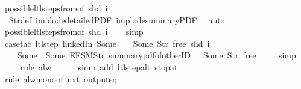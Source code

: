 \begin{isabellebody}
\ possible{\isacharunderscore}ltl{\isacharunderscore}steps{\isacharunderscore}from{\isacharunderscore}{}{\isacharbrackleft}of\ {\isachardoublequoteopen}shd\ i{\isachardoublequoteclose}{\isacharbrackright}\isanewline
\ \ Str{\isacharunderscore}def\ implode{\isacharunderscore}detailedPDF\ implode{\isacharunderscore}summaryPDF\ \isamarkupfalse%
\ auto{\isacharbrackleft}{}{\isacharbrackright}\isanewline
\ \ \isamarkupfalse%
\ possible{\isacharunderscore}ltl{\isacharunderscore}steps{\isacharunderscore}from{\isacharunderscore}{}{\isacharbrackleft}of\ {\isachardoublequoteopen}shd\ i{\isachardoublequoteclose}{\isacharbrackright}\isanewline
\ \ \isamarkupfalse%
\ simp\isanewline
\ \ \isamarkupfalse%
\ {\isacharparenleft}case{\isacharunderscore}tac\ {\isachardoublequoteopen}ltl{\isacharunderscore}step\ linkedIn\ {\isacharparenleft}Some\ {}{\isacharparenright}\ {\isacharparenleft}{\isacharless}{\isachargreater}{\isacharparenleft}{}\ {\isachardollar}{\isacharcolon}{\isacharequal}\ Some\ {\isacharparenleft}Str\ {\isacharprime}{\isacharprime}free{\isacharprime}{\isacharprime}{\isacharparenright}{\isacharparenright}{\isacharparenright}\ {\isacharparenleft}shd\ i{\isacharparenright}\ {\isacharequal}\isanewline
\ \ \ \ {\isacharparenleft}Some\ {}{\isacharcomma}\ {\isacharbrackleft}Some\ {\isacharparenleft}EFSM{\isachardot}Str\ {\isacharprime}{\isacharprime}summary{\isacharunderscore}pdf{\isacharunderscore}of{\isacharunderscore}otherID{\isacharprime}{\isacharprime}{\isacharparenright}{\isacharbrackright}{\isacharcomma}\ {\isacharless}{\isachargreater}{\isacharparenleft}{}\ {\isachardollar}{\isacharcolon}{\isacharequal}\ Some\ {\isacharparenleft}Str\ {\isacharprime}{\isacharprime}free{\isacharprime}{\isacharprime}{\isacharparenright}{\isacharparenright}{\isacharparenright}{\isachardoublequoteclose}{\isacharparenright}\isanewline
\ \ \ \isamarkupfalse%
\ simp\isanewline
\ \ \ \isamarkupfalse%
\ {\isacharparenleft}rule\ alw{\isacharparenright}\isanewline
\ \ \ \ \isamarkupfalse%
\ {\isacharparenleft}simp\ add{\isacharcolon}\ ltl{\isacharunderscore}step{\isacharunderscore}alt\ stop{\isacharunderscore}at{\isacharunderscore}{}{\isacharparenright}\isanewline
\ \ \ \isamarkupfalse%
\ {\isacharparenleft}rule\ alw{\isacharunderscore}mono{\isacharbrackleft}of\ {\isachardoublequoteopen}nxt\ {\isacharparenleft}output{\isacharunderscore}eq\ {\isacharbrackleft}{\isacharbrackright}{\isacharparenright}{\isachardoublequoteclose}{\isacharbrackright}{\isacharparenright}\isanewline

\end{isabellebody}

